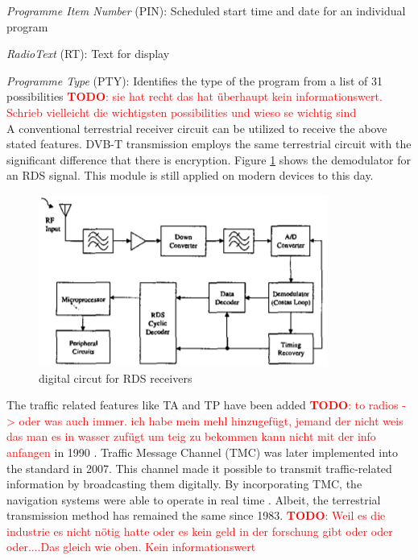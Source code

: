 \documentclass[conference,11pt,a4paper]{IEEEtran}
\newcommand{\todo}[1]{\textcolor{red}{\textbf{TODO}: #1}}
\begin{document}
		\textit{Programme Item Number} (PIN): Scheduled start time and date for an individual program
		
		\textit{RadioText}  (RT): Text for display
		
		\textit{Programme Type} (PTY): Identifies the type of the program from a list of 31 possibilities \todo{sie hat recht das hat überhaupt kein informationswert. Schrieb vielleicht die wichtigsten possibilities und wieso se wichtig sind}\\
		
		A conventional terrestrial receiver circuit can be utilized to receive the above stated features. DVB-T transmission employs the same terrestrial circuit with the significant difference that there is encryption. Figure \ref{fig: receiverCircut} shows the demodulator for an RDS signal. This module is still applied on modern devices to this day.
		
		\begin{figure}[h]
			\centering
			\includegraphics[width = \linewidth]{img/circut}
			\caption{digital circut for RDS receivers}
			\label{fig: receiverCircut}
		\end{figure}
	
		The traffic related features like TA and TP have been added \todo{to radios -> oder was auch immer. ich habe mein mehl hinzugefügt, jemand der nicht weis das man es in wasser zufügt um teig zu bekommen kann nicht mit der info anfangen} in 1990 \cite{TATP}. Traffic Message Channel (TMC) was later implemented into the standard in 2007. This channel made it possible to transmit traffic-related information by broadcasting them digitally. By incorporating TMC, the navigation systems were able to operate in real time  \cite{barca2017radio}. Albeit, the terrestrial transmission method has remained the same since 1983. \todo{Weil es die industrie es nicht nötig hatte oder es kein geld in der forschung gibt oder oder oder....Das gleich wie oben. Kein informationswert}\\
\end{document}
